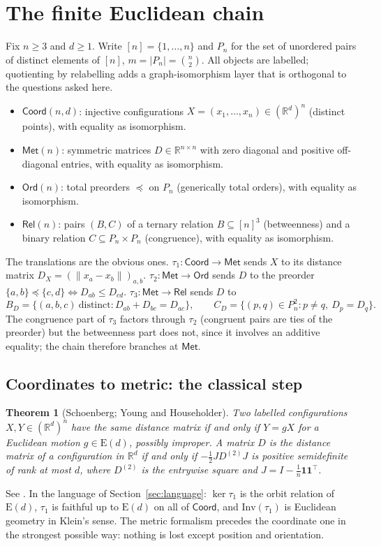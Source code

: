 \documentclass[11pt,a4paper]{article}
\theoremstyle{plain}
\newtheorem{theorem}{Theorem}[section]
\theoremstyle{definition}
\theoremstyle{remark}
\newcommand{\R}{\mathbb{R}}
\newcommand{\Inv}{\mathrm{Inv}}
\newcommand{\Euc}{\mathrm{E}}
\newcommand{\Fcoord}{\mathsf{Coord}}
\newcommand{\Fmet}{\mathsf{Met}}
\newcommand{\Ford}{\mathsf{Ord}}
\newcommand{\Frel}{\mathsf{Rel}}
\newcommand{\ord}{\preccurlyeq}
\begin{document}
\section{The finite Euclidean chain}\label{sec:euclid}

Fix $n\ge 3$ and $d\ge 1$. Write $[n]=\{1,\dots,n\}$ and $P_n$ for the set of unordered pairs of distinct elements of $[n]$, $m=|P_n|=\binom n2$. All objects are labelled; quotienting by relabelling adds a graph-isomorphism layer that is orthogonal to the questions asked here.

\begin{itemize}[leftmargin=2em]
\item $\Fcoord(n,d)$: injective configurations $X=(x_1,\dots,x_n)\in(\R^d)^n$ (distinct points), with equality as isomorphism.
\item $\Fmet(n)$: symmetric matrices $D\in\R^{n\times n}$ with zero diagonal and positive off-diagonal entries, with equality as isomorphism.
\item $\Ford(n)$: total preorders $\ord$ on $P_n$ (generically total orders), with equality as isomorphism.
\item $\Frel(n)$: pairs $(B,C)$ of a ternary relation $B\subseteq[n]^3$ (betweenness) and a binary relation $C\subseteq P_n\times P_n$ (congruence), with equality as isomorphism.
\end{itemize}

The translations are the obvious ones. $\tau_1\colon\Fcoord\to\Fmet$ sends $X$ to its distance matrix $D_X=(\lVert x_a-x_b\rVert)_{a,b}$. $\tau_2\colon\Fmet\to\Ford$ sends $D$ to the preorder $\{a,b\}\ord\{c,d\}\iff D_{ab}\le D_{cd}$. $\tau_3\colon\Fmet\to\Frel$ sends $D$ to
\[
B_D=\{(a,b,c)\ \text{distinct}: D_{ab}+D_{bc}=D_{ac}\},\qquad
C_D=\{(p,q)\in P_n^2: p\ne q,\ D_p=D_q\}.
\]
The congruence part of $\tau_3$ factors through $\tau_2$ (congruent pairs are ties of the preorder) but the betweenness part does not, since it involves an additive equality; the chain therefore branches at $\Fmet$.

\subsection{Coordinates to metric: the classical step}

\begin{theorem}[Schoenberg; Young and Householder]\label{thm:classical}
Two labelled configurations $X,Y\in(\R^d)^n$ have the same distance matrix if and only if $Y=gX$ for a Euclidean motion $g\in\Euc(d)$, possibly improper. A matrix $D$ is the distance matrix of a configuration in $\R^d$ if and only if $-\tfrac12 J D^{(2)} J$ is positive semidefinite of rank at most $d$, where $D^{(2)}$ is the entrywise square and $J=I-\tfrac1n\mathbf 1\mathbf 1^{\!\top}$.
\end{theorem}
\noindent See \citet{schoenberg1935,younghouseholder1938,blumenthal1953}. In the language of Section~\ref{sec:language}: $\ker\tau_1$ is the orbit relation of $\Euc(d)$, $\tau_1$ is faithful up to $\Euc(d)$ on all of $\Fcoord$, and $\Inv(\tau_1)$ is Euclidean geometry in Klein's sense. The metric formalism precedes the coordinate one in the strongest possible way: nothing is lost except position and orientation.
\end{document}
